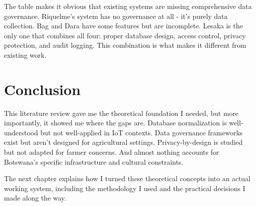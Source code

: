 The table makes it obvious that existing systems are missing comprehensive data governance. Riquelme's system has no governance at all - it's purely data collection. Bag and Dara have some features but are incomplete. Lesaka is the only one that combines all four: proper database design, access control, privacy protection, and audit logging. This combination is what makes it different from existing work.

\section{Conclusion}

This literature review gave me the theoretical foundation I needed, but more importantly, it showed me where the gaps are. Database normalization is well-understood but not well-applied in IoT contexts. Data governance frameworks exist but aren't designed for agricultural settings. Privacy-by-design is studied but not adapted for farmer concerns. And almost nothing accounts for Botswana's specific infrastructure and cultural constraints.

The next chapter explains how I turned these theoretical concepts into an actual working system, including the methodology I used and the practical decisions I made along the way.
